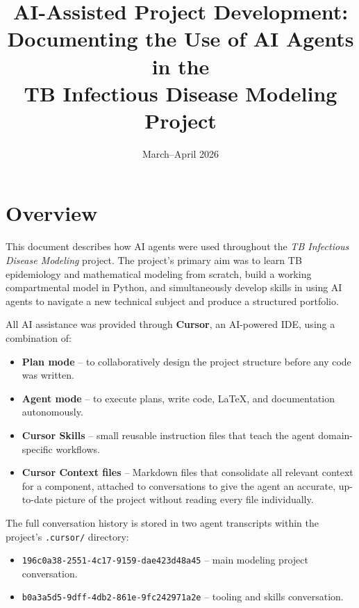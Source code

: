 \documentclass[11pt]{article}
\title{AI-Assisted Project Development:\\
  Documenting the Use of AI Agents in the\\ TB Infectious Disease Modeling Project}
\author{}
\date{March--April 2026}
\begin{document}
\maketitle
\setcounter{tocdepth}{2}
\tableofcontents
\newpage

\section{Overview}

This document describes how AI agents were used throughout the \textit{TB Infectious Disease Modeling} project. The project's primary aim was to learn TB epidemiology and mathematical modeling from scratch, build a working compartmental model in Python, and simultaneously develop skills in using AI agents to navigate a new technical subject and produce a structured portfolio.

All AI assistance was provided through \textbf{Cursor}, an AI-powered IDE, using a combination of:
\begin{itemize}[noitemsep]
  \item \textbf{Plan mode} -- to collaboratively design the project structure before any code was written.
  \item \textbf{Agent mode} -- to execute plans, write code, LaTeX, and documentation autonomously.
  \item \textbf{Cursor Skills} -- small reusable instruction files that teach the agent domain-specific workflows.
  \item \textbf{Cursor Context files} -- Markdown files that consolidate all relevant context for a component, attached to conversations to give the agent an accurate, up-to-date picture of the project without reading every file individually.
\end{itemize}

The full conversation history is stored in two agent transcripts within the project's \texttt{.cursor/} directory:
\begin{itemize}[noitemsep]
  \item \texttt{196c0a38-2551-4c17-9159-dae423d48a45} -- main modeling project conversation.
  \item \texttt{b0a3a5d5-9dff-4db2-861e-9fc242971a2e} -- tooling and skills conversation.
\end{itemize}

\end{document}

